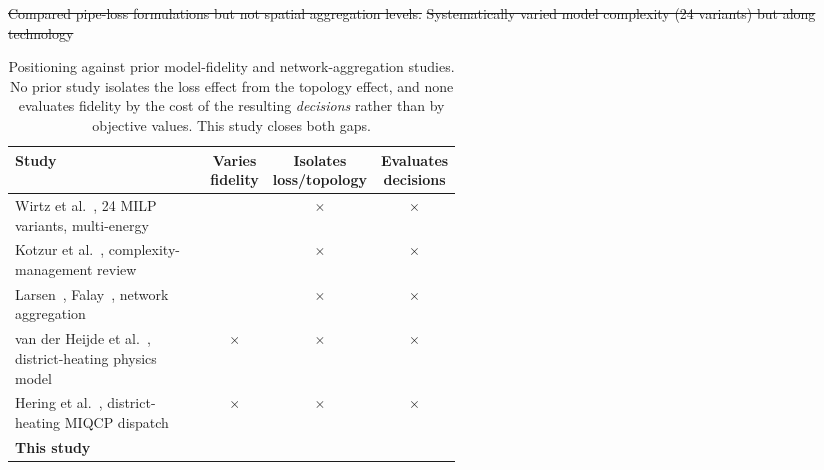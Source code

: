 \documentclass[a4paper,fleqn]{cas-sc} %
\renewcommand{\checkmark}{\ding{51}} %
\providecommand{\citet}[1]{\cite{#1}} %
\providecommand{\DIFdel}[1]{{\protect\color{red}\sout{#1}}} %
\providecommand{\DIFdelFL}[1]{\DIFdel{#1}} %
\providecommand{\DIFaddbeginFL}{} %
\providecommand{\DIFdelendFL}{} %
\providecommand{\Lnl}{\ensuremath{\mathrm{L3^{\mathrm{NL}}}}}
\begin{document}
\begin{table}[t]
\DIFdelFL{Compared pipe-loss formulations but not spatial
    aggregation levels. }%
\DIFdelFL{Systematically varied model complexity (24 variants)
    but along technology}\DIFdelendFL \DIFaddbeginFL \small
\caption{Positioning against prior model-fidelity and network-aggregation studies. No prior
study isolates the loss effect from the topology effect, and none evaluates fidelity by the
cost of the resulting \emph{decisions} rather than by objective values. This study closes both
gaps.}
\label{tab:priorwork}
\setlength{\tabcolsep}{5pt}
\begin{tabular}{@{}p{0.52\linewidth}ccc@{}}
\toprule
Study & \makecell{Varies\\fidelity} & \makecell{Isolates\\loss/topology} & \makecell{Evaluates\\decisions} \\
\midrule
Wirtz et al.~\cite{Wirtz2021_complexity}, 24 MILP variants, multi-energy & \checkmark & $\times$ & $\times$ \\
Kotzur et al.~\cite{Kotzur2021}, complexity-management review & \checkmark & $\times$ & $\times$ \\
Larsen~\cite{Larsen2004}, Falay~\cite{Falay2020}, network aggregation & \checkmark & $\times$ & $\times$ \\
van der Heijde et al.~\cite{vanderHeijde2017}, district-heating physics model & $\times$ & $\times$ & $\times$ \\
Hering et al.~\cite{Hering2021}, district-heating MIQCP dispatch & $\times$ & $\times$ & $\times$ \\
\textbf{This study} & \checkmark & \checkmark & \checkmark \\
\bottomrule
\end{tabular}
\end{table}
\end{document}
